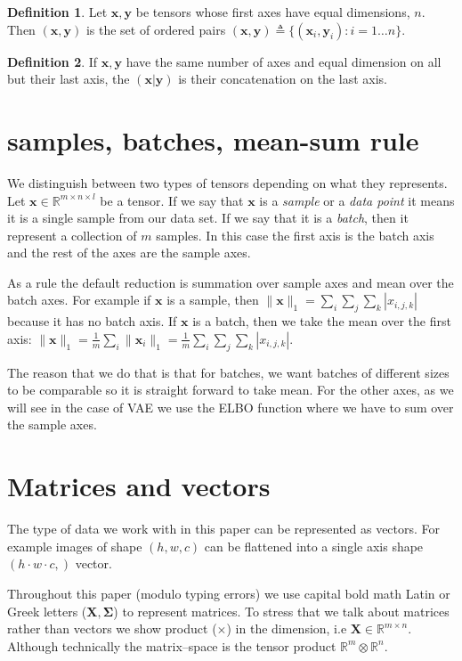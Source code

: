 \documentclass[11pt, a4paper]{report}
\theoremstyle{plain}
\theoremstyle{definition}
\newtheorem{mydef}{Definition}[chapter]
\theoremstyle{remark}
\newcommand{\R}{\mathbb{R}}
\newcommand{\x}{\mathbf{x}}
\newcommand{\y}{\mathbf{y}}
\newcommand{\bv}[1]{\boldsymbol{#1}}
\begin{document}
\begin{mydef}
\label{def:pairnotaion}
Let $\x, \y$ be tensors whose first axes have equal dimensions, $n$. Then $(\x, \y)$
is the set of ordered pairs $(\x,\y) \triangleq \{(\x_i,\y_i) : i=1 \dots n\}$.
\end{mydef}

\begin{mydef}
\label{def:concat}
If $\x,\y$ have the same number of axes and equal dimension on all but their last axis, 
the $(\x|\y)$ is their concatenation on the last axis. 
\end{mydef}

\section{samples, batches, mean-sum rule}

We distinguish between two types of tensors depending on what they represents.
Let $\x \in \R^{m \times n \times l}$ be a tensor. If we say that $\x$ is a
\emph{sample} or a \emph{data point} it means it is a single sample from our
data set. If we say that it is a \emph{batch}, then it represent a collection of
$m$ samples. In this case the first axis is the batch axis and the rest of the
axes are the sample axes.

As a rule the default reduction is summation over sample axes and mean over the
batch axes. For example if $\x$ is a sample, then $\|\x \|_1 = \sum_i \sum_j
\sum_k |x_{i,j,k}|$ because it has no batch axis. If $\x$ is a batch, then we
take the mean over the first axis: $\| \x \|_1 = \frac{1}{m} \sum_i \| \x_i \|_1
= \frac{1}{m} \sum_i \sum_j \sum_k |x_{i,j,k}|$.

The reason that we do that is that for batches, we want batches of different
sizes to be comparable so it is straight forward to take mean. For the other
axes, as we will see in the case of VAE we use the ELBO function where we have
to sum over the sample axes.

\label{meansumrule}


\section{Matrices and vectors}

The type of data we work with in this paper can be represented as vectors. For
example images of shape $(h,w,c)$ can be flattened into a single axis shape $(h
\cdot w \cdot c,)$ vector.

Throughout this paper (modulo typing errors) we use capital bold math Latin or
Greek letters ($\bv{X, \Sigma}$) to represent matrices. To stress that we talk
about matrices rather than vectors we show product ($\times$) in the dimension,
i.e $\bv{X} \in \R^{m \times n}$. Although technically the matrix--space is the
tensor product $\R^m \otimes \R^n$.
\end{document}

